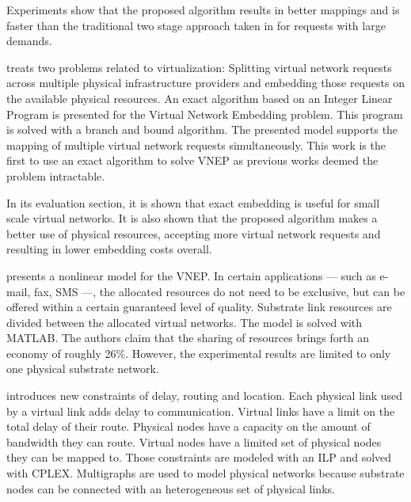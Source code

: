 Experiments show that the proposed algorithm results in better mappings and is faster than the traditional two stage approach taken in \cite{Yu2008} for requests with large demands.



\citet{Houidi:2011} treats two problems related to virtualization: Splitting virtual network requests across multiple physical infrastructure providers and embedding those requests on the available physical resources. An exact algorithm based on an Integer Linear Program is presented for the Virtual Network Embedding problem. This program is solved with a branch and bound algorithm. The presented model supports the mapping of multiple virtual network requests simultaneously.
This work is the first to use an exact algorithm to solve VNEP as previous works deemed the problem intractable.

In its evaluation section, it is shown that exact embedding is useful for small scale virtual networks. It is also shown that the proposed algorithm makes a better use of physical resources, accepting more virtual network requests and resulting in lower embedding costs overall.



\citet{Trinh:2011} presents a nonlinear model for the VNEP\@. In certain applications --- such as e-mail, fax, SMS ---, the allocated resources do not need to be exclusive, but can be offered within a certain guaranteed level of quality. Substrate link resources are divided between the allocated virtual networks. The model is solved with MATLAB. The authors claim that the sharing of resources brings forth an economy of roughly 26\%. However, the experimental results are limited to only one physical substrate network. 



\citet{infuhr:2011} introduces new constraints of delay, routing and location. Each physical link used by a virtual link adds delay to communication. Virtual links have a limit on the total delay of their route. Physical nodes have a capacity on the amount of bandwidth they can route. Virtual nodes have a limited set of physical nodes they can be mapped to. Those constraints are modeled with an ILP and solved with CPLEX. Multigraphs are used to model physical networks because substrate nodes can be connected with an heterogeneous set of physical links.

